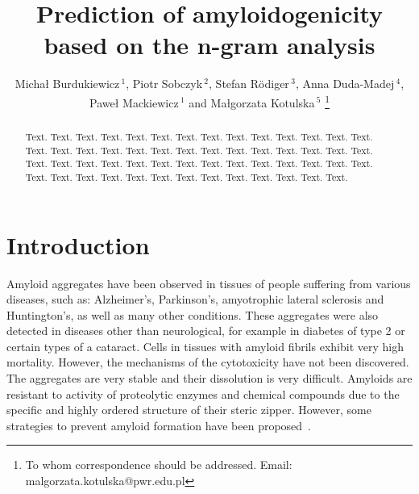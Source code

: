 \documentclass[a4,center,fleqn]{NAR}
\begin{document}
\title{Prediction of amyloidogenicity based on the n-gram analysis}

\author{Micha\l{} Burdukiewicz\,$^{1}$, Piotr Sobczyk\,$^{2}$, 
Stefan R\"{o}diger\,$^{3}$,
Anna Duda-Madej\,$^{4}$,
Pawe\l{} Mackiewicz\,$^{1}$ and Ma\l{}gorzata Kotulska\,$^{5}$
\footnote{To whom correspondence should be addressed.
Email: malgorzata.kotulska@pwr.edu.pl}}

\address{
$^{1}$University of Wroc\l{}aw, Department of Genomics,
$^{2}$Wroc\l{}aw University of Science and Technology, Department of Mathematics 
$^{3}$Brandenburg University of Technology Cottbus-Senftenberg, Institute of Biotechnology
$^{4}$Wroclaw Medical University, Department of Microbiology
and 
$^{5}$Wroc\l{}aw University of Science and Technology, Department of Biomedical 
Engineering, Faculty of Fundamental Problems of Technology
}


\maketitle

\begin{abstract}
Text. Text. Text. Text. Text. Text. Text. Text. Text. Text. Text.
Text. Text. Text. Text. Text. Text. Text. Text. Text. Text. Text.
Text. Text. Text. Text. Text. Text. Text. Text. Text. Text. Text.
Text. Text. Text. Text. Text. Text. Text. Text. Text. Text. Text.
Text. Text. Text. Text. Text. Text. Text. Text. Text. Text. Text.

\end{abstract}

\section{Introduction}


Amyloid aggregates have been observed in tissues of people suffering from various diseases, such as: Alzheimer's, Parkinson's, amyotrophic lateral sclerosis and Huntington's, as well as many other conditions. These aggregates were also detected in diseases other than neurological, for example in diabetes of type 2 or certain types 
of a cataract. Cells in tissues with amyloid fibrils exhibit very high 
mortality. However, the mechanisms of the cytotoxicity have not been 
discovered. 
The aggregates are very stable and their dissolution is very difficult. Amyloids are 
resistant to activity of proteolytic enzymes and chemical compounds due to the 
specific and highly ordered structure of their steric zipper. However, some strategies to prevent amyloid formation have been proposed~\citep{hard_inhibition_2012}.
\end{document}
